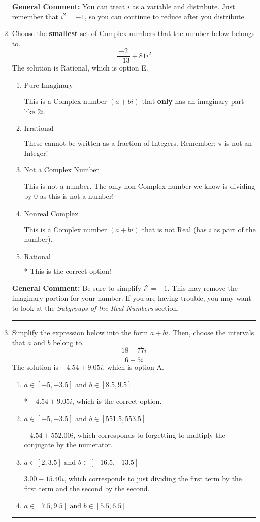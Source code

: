 \documentclass{extbook}[14pt]
\newcommand{\litem}[1]{\item #1

\rule{\textwidth}{0.4pt}}
\begin{document}
\begin{enumerate}
{\textbf{General Comment:} You can treat $i$ as a variable and distribute. Just remember that $i^2=-1$, so you can continue to reduce after you distribute.
}
\litem{
Choose the \textbf{smallest} set of Complex numbers that the number below belongs to.
\[ \frac{-2}{-13}+81i^2 \]The solution is \( \text{Rational} \), which is option E.\begin{enumerate}[label=\Alph*.]
\item \( \text{Pure Imaginary} \)

This is a Complex number $(a+bi)$ that \textbf{only} has an imaginary part like $2i$.
\item \( \text{Irrational} \)

These cannot be written as a fraction of Integers. Remember: $\pi$ is not an Integer!
\item \( \text{Not a Complex Number} \)

This is not a number. The only non-Complex number we know is dividing by 0 as this is not a number!
\item \( \text{Nonreal Complex} \)

This is a Complex number $(a+bi)$ that is not Real (has $i$ as part of the number).
\item \( \text{Rational} \)

* This is the correct option!
\end{enumerate}

\textbf{General Comment:} Be sure to simplify $i^2 = -1$. This may remove the imaginary portion for your number. If you are having trouble, you may want to look at the \textit{Subgroups of the Real Numbers} section.
}
\litem{
Simplify the expression below into the form $a+bi$. Then, choose the intervals that $a$ and $b$ belong to.
\[ \frac{18 + 77 i}{6 - 5 i} \]The solution is \( -4.54  + 9.05 i \), which is option A.\begin{enumerate}[label=\Alph*.]
\item \( a \in [-5, -3.5] \text{ and } b \in [8.5, 9.5] \)

* $-4.54  + 9.05 i$, which is the correct option.
\item \( a \in [-5, -3.5] \text{ and } b \in [551.5, 553.5] \)

 $-4.54  + 552.00 i$, which corresponds to forgetting to multiply the conjugate by the numerator.
\item \( a \in [2, 3.5] \text{ and } b \in [-16.5, -13.5] \)

 $3.00  - 15.40 i$, which corresponds to just dividing the first term by the first term and the second by the second.
\item \( a \in [7.5, 9.5] \text{ and } b \in [5.5, 6.5] \)


\end{enumerate}}
\end{enumerate}
\end{document}

